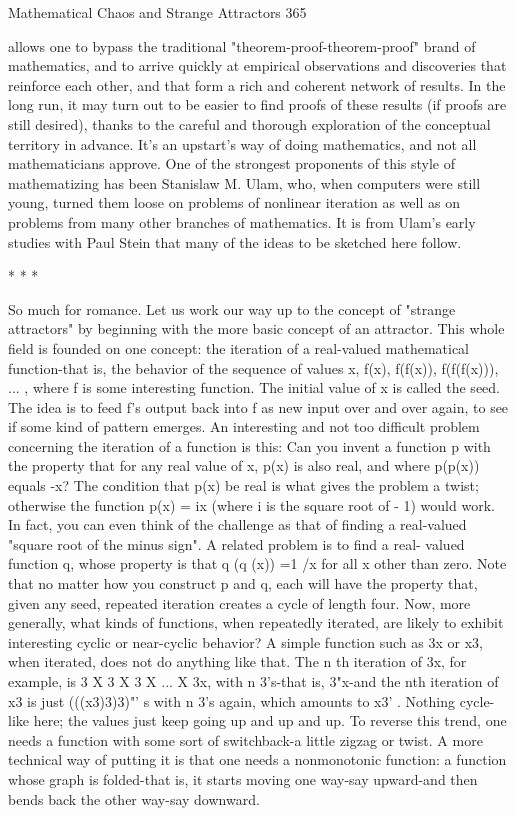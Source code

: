 Mathematical Chaos and Strange Attractors                                           365

allows one to bypass the traditional "theorem-proof-theorem-proof" brand of
mathematics, and to arrive quickly at empirical observations and discoveries that
reinforce each other, and that form a rich and coherent network of results. In the long
run, it may turn out to be easier to find proofs of these results (if proofs are still
desired), thanks to the careful and thorough exploration of the conceptual territory in
advance. It's an upstart's way of doing mathematics, and not all mathematicians
approve.
        One of the strongest proponents of this style of mathematizing has been
Stanislaw M. Ulam, who, when computers were still young, turned them loose on
problems of nonlinear iteration as well as on problems from many other branches of
mathematics. It is from Ulam's early studies with Paul Stein that many of the ideas to
be sketched here follow.

                                       *    *   *

         So much for romance. Let us work our way up to the concept of "strange
attractors" by beginning with the more basic concept of an attractor. This whole field
is founded on one concept: the iteration of a real-valued mathematical function-that is,
the behavior of the sequence of values x, f(x), f(f(x)), f(f(f(x))), ... , where f is some
interesting function. The initial value of x is called the seed. The idea is to feed f's
output back into f as new input over and over again, to see if some kind of pattern
emerges.
         An interesting and not too difficult problem concerning the iteration of a
function is this: Can you invent a function p with the property that for any real value
of x, p(x) is also real, and where p(p(x)) equals -x? The condition that p(x) be real is
what gives the problem a twist; otherwise the function p(x) = ix (where i is the square
root of - 1) would work. In fact, you can even think of the challenge as that of finding
a real-valued "square root of the minus sign". A related problem is to find a real-
valued function q, whose property is that q (q (x)) =1 /x for all x other than zero. Note
that no matter how you construct p and q, each will have the property that, given any
seed, repeated iteration creates a cycle of length four.
         Now, more generally, what kinds of functions, when repeatedly iterated, are
likely to exhibit interesting cyclic or near-cyclic behavior? A simple function such as
3x or x3, when iterated, does not do anything like that. The n th iteration of 3x, for
example, is 3 X 3 X 3 X ... X 3x, with n 3's-that is, 3"x-and the nth iteration of x3 is
just (((x3)3)3)"' s with n 3's again, which amounts to x3' . Nothing cycle-like here; the
values just keep going up and up and up. To reverse this trend, one needs a function
with some sort of switchback-a little zigzag or twist. A more technical way of putting
it is that one needs a nonmonotonic function: a function whose graph is folded-that is,
it starts moving one way-say upward-and then bends back the other way-say
downward.




